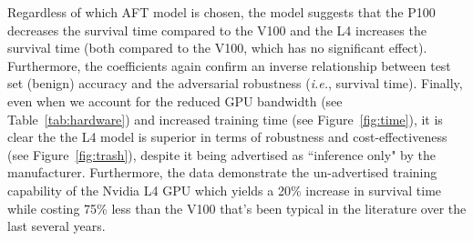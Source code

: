 \documentclass[sn-mathphys-num]{sn-jnl}%
\begin{document}
Regardless of which AFT model is chosen, the model suggests that the P100 decreases the survival time compared to the V100 and the L4 increases the survival time (both compared to the V100, which has no significant effect).
Furthermore, the coefficients again confirm an inverse relationship between test set (benign) accuracy and the adversarial robustness (\textit{i.e.}, survival time). 
Finally, even when we account for the reduced GPU bandwidth (see Table~\ref{tab:hardware}) and increased training time (see Figure~\ref{fig:time}), it is clear the the L4 model is superior in terms of robustness and cost-effectiveness (see Figure~\ref{fig:trash}), despite it being advertised as ``inference only" by the manufacturer. 
Furthermore, the data demonstrate the un-advertised training capability of the Nvidia L4 GPU which yields a 20\% increase in survival time while costing 75\% less than the V100 that's been typical in the literature over the last several years.









\printglossary

\end{document}
